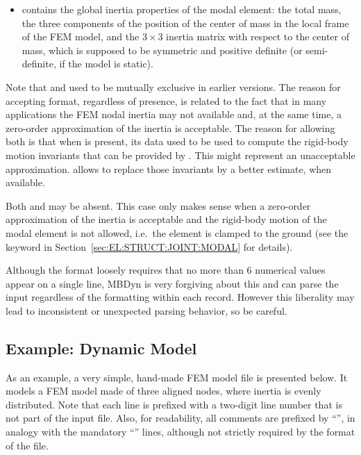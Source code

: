 \begin{itemize}
\item {} contains the global inertia properties
of the modal element: the total mass, the three components 
of the position of the center of mass in the local frame
of the FEM model, and the $3\times{3}$ inertia matrix
with respect to the center of mass, which is supposed
to be symmetric and positive definite (or semi-definite,
if the model is static).
\end{itemize}

Note that  and 
used to be mutually exclusive in earlier versions.
The reason for accepting  format,
regardless of  presence, is related
to the fact that in many applications the FEM nodal inertia
may not available and, at the same time, a zero-order approximation
of the inertia is acceptable.
The reason for allowing both is that when 
is present, its data used to be used to compute the rigid-body
motion invariants that can be provided by .
This might represent an unacceptable approximation.
 allows to replace those invariants
by a better estimate, when available.

Both  and  may be absent.
This case only makes sense when a zero-order approximation
of the inertia is acceptable and the rigid-body motion
of the modal element is not allowed, i.e.\ the element is clamped
to the ground (see the keyword 
in Section~\ref{sec:EL:STRUCT:JOINT:MODAL} for details).


Although the format loosely requires that no more than 6 numerical values 
appear on a single line, MBDyn is very forgiving about this and can parse
the input regardless of the formatting within each record.
However this liberality may lead to inconsistent or unexpected parsing
behavior, so be careful.



\subsection{Example: Dynamic Model}
\label{sec:APP:EL:STRUCT:JOINT:MODAL:DYNAMIC-MODEL}
As an example, a very simple, hand-made FEM model file is presented below.
It models a FEM model made of three aligned nodes, where inertia 
is evenly distributed.
Note that each line is prefixed with a two-digit line number 
that is not part of the input file.
Also, for readability, all comments are prefixed by ``\kw{**}'', in analogy
with the mandatory ``'' lines, although not strictly
required by the format of the file.


